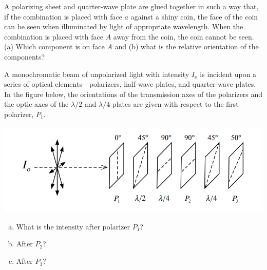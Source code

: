 \documentclass[12pt,letterpaper]{hmcpset}
\begin{document}
	\begin{problem}[44P5:]
		A polarizing sheet and quarter-wave plate are glued together in such a way that, if the combination is placed with face $a$ against a shiny coin, the face of the coin can be seen when illuminated by light of appropriate wavelength.
		When the combination is placed with face $A$ away from the coin, the coin cannot be seen. (a) Which component is on face $A$ and (b) what is the relative orientation of the components?
	\end{problem}
	\clearpage



	\begin{problem}[SUP 11.1:]
		A monochromatic beam of unpolarized light with intensity $I_o$ is incident upon a series of optical elements—polarizers, half-wave plates, and quarter-wave plates.
		In the figure below, the orientations of the transmission axes of the polarizers and the optic axes of the $\lambda/2$ and $\lambda/4$ plates are given with respect to the first polarizer, $P_1$.

		\centering\includegraphics[scale = 0.6]{Sup_11-1}

		\begin{enumerate}[(a)]
			\item What is the intensity after polarizer $P_1$?
			\item After $P_2$?
			\item After $P_3$?
		\end{enumerate}
	\end{problem}
	\clearpage
\end{document}
